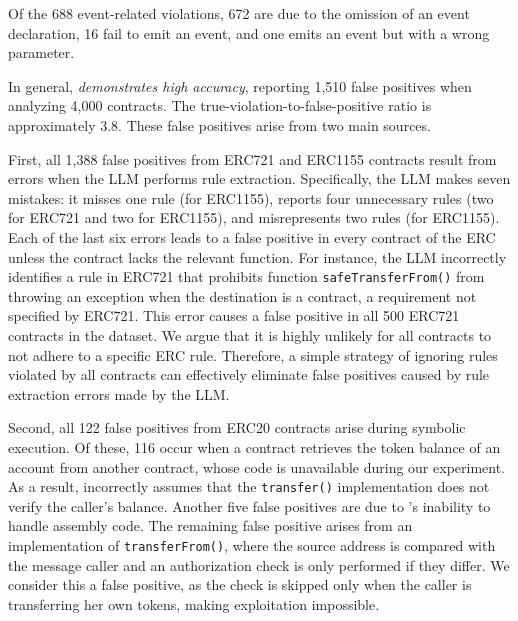 %


Of the 688 event-related violations, 672 are due to the omission of an event declaration, 16 fail to emit an event, 
and one emits an event but with a wrong parameter. 


In general, \emph{\Tool{} demonstrates high accuracy}, reporting 1,510 false positives when analyzing 4,000 contracts. The true-violation-to-false-positive ratio is approximately 3.8. These false positives arise from two main sources.

First, all 1,388 false positives from ERC721 and ERC1155 contracts 
result from errors when the LLM performs rule extraction. 
Specifically, the LLM makes seven mistakes: it misses one rule (for ERC1155), 
reports four unnecessary rules (two for ERC721 and two for ERC1155), 
and misrepresents two rules (for ERC1155). 
Each of the last six errors leads to a false positive in every contract of the ERC 
unless the 
contract lacks the relevant function. For instance, 
the LLM incorrectly identifies a rule in ERC721 that 
prohibits function \texttt{safeTransferFrom()} from throwing an exception when the destination is a contract, a requirement not specified by ERC721. 
This error causes a false positive in all 500 ERC721 contracts 
in the dataset. We argue that it is highly unlikely for all contracts to not adhere to 
a specific ERC rule. Therefore, a simple strategy of ignoring 
rules violated by all contracts can effectively eliminate false positives 
caused by rule extraction errors made by the LLM.

Second, all 122 false positives from ERC20 contracts arise 
during symbolic execution. Of these, 116 occur when a contract 
retrieves the token balance of an account from another contract, 
whose code is unavailable during our experiment. 
As a result, \Tool{} incorrectly assumes that the \texttt{transfer()} implementation 
does not verify the caller's balance. 
Another five false positives are due to \Tool{}'s inability to handle assembly code.
The remaining false positive arises from an implementation of \texttt{transferFrom()}, 
where the source address is compared with the message caller and an authorization check is only performed if they differ. 
We consider this a false positive, as the check is skipped only when 
the caller is transferring her own tokens, making exploitation impossible.


